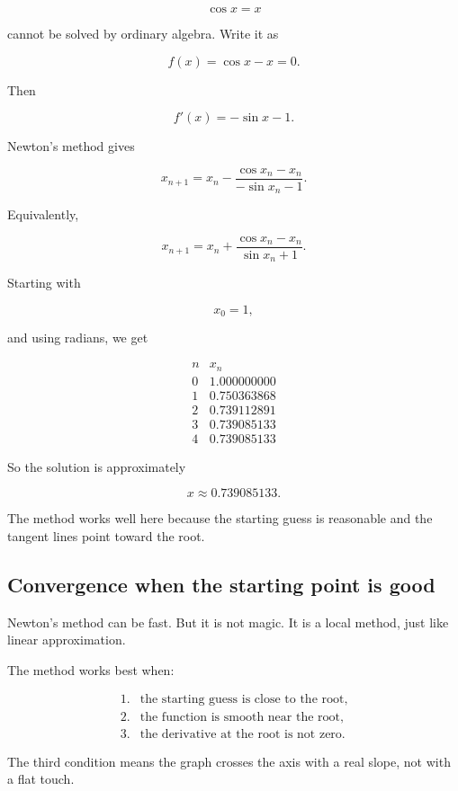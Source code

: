 \[
\cos x=x
\]

cannot be solved by ordinary algebra.  Write it as

\[
f(x)=\cos x-x=0.
\]

Then

\[
f'(x)=-\sin x-1.
\]

Newton's method gives

\[
x_{n+1}
=
x_n-\frac{\cos x_n-x_n}{-\sin x_n-1}.
\]

Equivalently,

\[
x_{n+1}
=
x_n+\frac{\cos x_n-x_n}{\sin x_n+1}.
\]

Starting with

\[
x_0=1,
\]

and using radians, we get

\[
\begin{array}{c|c}
n & x_n \\ \hline
0 & 1.000000000\\
1 & 0.750363868\\
2 & 0.739112891\\
3 & 0.739085133\\
4 & 0.739085133
\end{array}
\]

So the solution is approximately

\[
\boxed{
x\approx0.739085133.
}
\]

The method works well here because the starting guess is reasonable and the tangent
lines point toward the root.

\subsection{Convergence when the starting point is good}
\label{subsec:newton-convergence-good-start}

Newton's method can be fast.  But it is not magic.  It is a local method, just like
linear approximation.

The method works best when:

\[
\begin{array}{ll}
\text{1.} & \text{the starting guess is close to the root,}\\
\text{2.} & \text{the function is smooth near the root,}\\
\text{3.} & \text{the derivative at the root is not zero.}
\end{array}
\]

The third condition means the graph crosses the axis with a real slope, not with a
flat touch.

